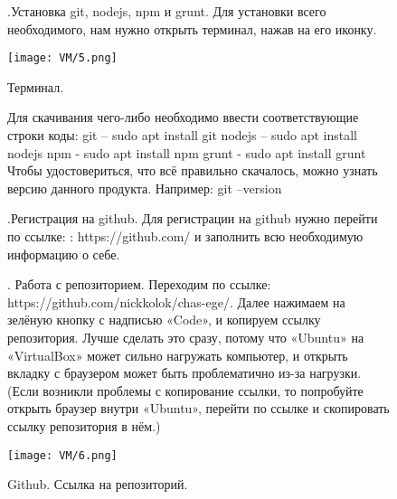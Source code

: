 \begin{figure}
.\quad Установка git, nodejs, npm и grunt.
\newline Для установки всего необходимого, нам нужно открыть терминал, нажав на его иконку.

		\centering
		\texttt{[image: VM/5.png]}
\caption{Терминал.}
\label{ris:image}
\end{figure}

\begin{figure}
\quad Для скачивания чего-либо необходимо ввести соответствующие строки коды:
\newline git – sudo apt install git
\newline nodejs – sudo apt install nodejs
\newline npm - sudo apt install npm
\newline grunt - sudo apt install grunt
\newline Чтобы удостовериться, что всё правильно скачалось, можно узнать версию данного продукта. Например: git –version
\end{figure}

\begin{figure}
.\quad  Регистрация на github.
\newline \quad Для регистрации на github нужно перейти по ссылке: : https://github.com/ и заполнить всю необходимую информацию о себе.
\end{figure}

\begin{figure}
. \quad Работа с репозиторием.
\newline \quad Переходим по ссылке: https://github.com/nickkolok/chas-ege/. Далее нажимаем на зелёную кнопку с надписью «Code», и копируем ссылку репозитория. Лучше сделать это сразу, потому что «Ubuntu» на «VirtualBox» может сильно нагружать компьютер, и открыть вкладку с браузером может быть проблематично из-за нагрузки. (Если возникли проблемы с копирование ссылки, то попробуйте открыть браузер внутри «Ubuntu», перейти по ссылке и скопировать ссылку репозитория в нём.)

		\centering
		\texttt{[image: VM/6.png]}
\caption{Github. Ссылка на репозиторий.}
\label{ris:image}
\end{figure}


